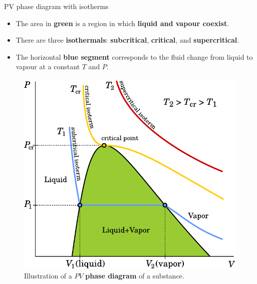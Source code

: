 \begin{frame}{PV phase diagram with isotherms}

\lcol
\begin{itemize}
\item The area in \textbf{green} is a region
in which \textbf{\alert{liquid and vapour coexist}}.
\item There are three \textbf{isothermals}: \alert{\textbf{subcritical}},
\alert{\textbf{critical}}, and \alert{\textbf{supercritical}}. 
\item The horizontal  \textbf{blue segment} corresponds to the fluid change from liquid to vapour at a constant $T$ and $P$. 
\end{itemize}
\rcol

\begin{figure}
\centering 
\includegraphics[width=1\textwidth]{figures/activity-models/phase-diagram-pv}
\caption{\footnotesize Illustration of a $PV$ \textbf{phase diagram} of a substance.}
\end{figure}

\ecol
\end{frame}
%
